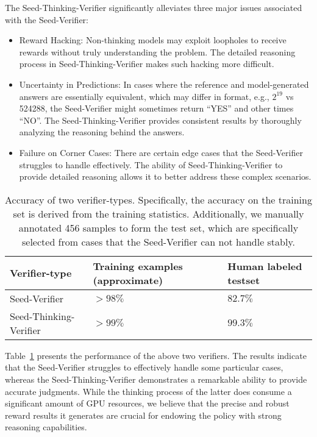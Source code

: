 The Seed-Thinking-Verifier significantly alleviates three major issues associated with the Seed-Verifier:
\begin{itemize}
    \item Reward Hacking: Non-thinking models may exploit loopholes to receive rewards without truly understanding the problem. The detailed reasoning process in Seed-Thinking-Verifier makes such hacking more difficult.
    \item Uncertainty in Predictions: In cases where the reference and model-generated answers are essentially equivalent, which may differ in format, e.g., $2^{19}$ vs 524288, the Seed-Verifier might sometimes return ``YES'' and other times ``NO''. The Seed-Thinking-Verifier provides consistent results by thoroughly analyzing the reasoning behind the answers.
    \item Failure on Corner Cases: There are certain edge cases that the Seed-Verifier struggles to handle effectively. The ability of Seed-Thinking-Verifier to provide detailed reasoning allows it to better address these complex scenarios.
\end{itemize}

\begin{table}
\centering
\begin{tabular}{p{3.7cm}|>{\centering\arraybackslash}p{5.5cm}|>{\centering\arraybackslash}p{5cm}}
\toprule
\textbf{Verifier-type} & \textbf{Training examples (approximate)} & \textbf{Human labeled testset}\\
\midrule
{Seed-Verifier} & $>98\%$ & $82.7\%$\\
{Seed-Thinking-Verifier} & $>99\%$ & $99.3\%$\\
\bottomrule
\end{tabular}
\caption{Accuracy of two verifier-types. Specifically, the accuracy on the training set is derived from the training statistics. Additionally, we manually annotated 456 samples to form the test set, which are specifically selected from cases that the Seed-Verifier can not handle stably.}
\label{tbl:verfier-acc}
\end{table}

Table~\ref{tbl:verfier-acc} presents the performance of the above two verifiers. %
The results indicate that the Seed-Verifier struggles to effectively handle some particular cases, whereas the Seed-Thinking-Verifier demonstrates a remarkable ability to provide accurate judgments. While the thinking process of the latter does consume a significant amount of GPU resources, we believe that the precise and robust reward results it generates are crucial for endowing the policy with strong reasoning capabilities.

